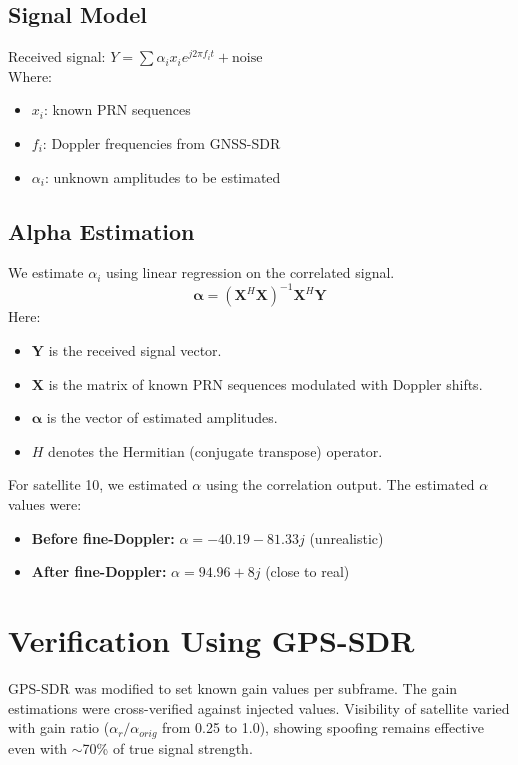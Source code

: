 \documentclass[12pt]{report}
\begin{document}
\subsection{Signal Model}
Received signal: $Y = \sum \alpha_i x_i e^{j2\pi f_i t} + \text{noise}$ \\
Where:
\begin{itemize}
  \item $x_i$: known PRN sequences
  \item $f_i$: Doppler frequencies from GNSS-SDR
  \item $\alpha_i$: unknown amplitudes to be estimated
\end{itemize}

\subsection{Alpha Estimation}
We estimate $\alpha_i$ using linear regression on the correlated signal.
\begin{equation}
\boldsymbol{\alpha} = (\mathbf{X}^H \mathbf{X})^{-1} \mathbf{X}^H \mathbf{Y}
\end{equation}
Here:
\begin{itemize}
    \item $\mathbf{Y}$ is the received signal vector.
    \item $\mathbf{X}$ is the matrix of known PRN sequences modulated with Doppler shifts.
    \item $\boldsymbol{\alpha}$ is the vector of estimated amplitudes.
    \item $H$ denotes the Hermitian (conjugate transpose) operator.
\end{itemize}
For satellite 10, we estimated $\alpha$ using the correlation output. The estimated $\alpha$ values were:
\begin{itemize}
  \item \textbf{Before fine-Doppler:} $\alpha = -40.19 - 81.33j$ (unrealistic)
  \item \textbf{After fine-Doppler:} $\alpha = 94.96 + 8j$ (close to real)
\end{itemize}

\section{Verification Using GPS-SDR}
GPS-SDR was modified to set known gain values per subframe. The gain estimations were cross-verified against injected values. Visibility of satellite varied with gain ratio ($\alpha_r/\alpha_{orig}$ from 0.25 to 1.0), showing spoofing remains effective even with $\sim$70\% of true signal strength.
\end{document}
